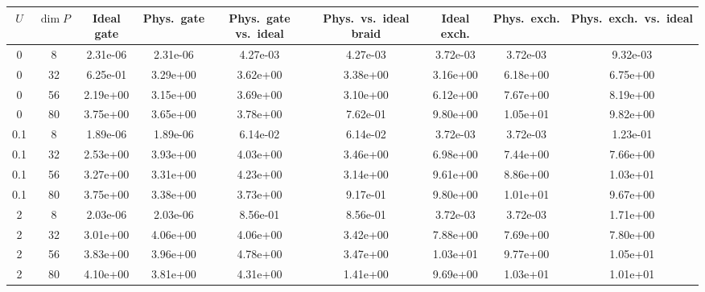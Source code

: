 \begin{tabular}{ccccccccc}
\hline
$U$ & $\dim P$ & Ideal gate & Phys.\ gate & Phys.\ gate vs.\ ideal & Phys.\ vs.\ ideal braid & Ideal exch. & Phys.\ exch. & Phys.\ exch.\ vs.\ ideal \\
\hline
0 & 8 & 2.31e-06 & 2.31e-06 & 4.27e-03 & 4.27e-03 & 3.72e-03 & 3.72e-03 & 9.32e-03 \\
0 & 32 & 6.25e-01 & 3.29e+00 & 3.62e+00 & 3.38e+00 & 3.16e+00 & 6.18e+00 & 6.75e+00 \\
0 & 56 & 2.19e+00 & 3.15e+00 & 3.69e+00 & 3.10e+00 & 6.12e+00 & 7.67e+00 & 8.19e+00 \\
0 & 80 & 3.75e+00 & 3.65e+00 & 3.78e+00 & 7.62e-01 & 9.80e+00 & 1.05e+01 & 9.82e+00 \\
\hline
0.1 & 8 & 1.89e-06 & 1.89e-06 & 6.14e-02 & 6.14e-02 & 3.72e-03 & 3.72e-03 & 1.23e-01 \\
0.1 & 32 & 2.53e+00 & 3.93e+00 & 4.03e+00 & 3.46e+00 & 6.98e+00 & 7.44e+00 & 7.66e+00 \\
0.1 & 56 & 3.27e+00 & 3.31e+00 & 4.23e+00 & 3.14e+00 & 9.61e+00 & 8.86e+00 & 1.03e+01 \\
0.1 & 80 & 3.75e+00 & 3.38e+00 & 3.73e+00 & 9.17e-01 & 9.80e+00 & 1.01e+01 & 9.67e+00 \\
\hline
2 & 8 & 2.03e-06 & 2.03e-06 & 8.56e-01 & 8.56e-01 & 3.72e-03 & 3.72e-03 & 1.71e+00 \\
2 & 32 & 3.01e+00 & 4.06e+00 & 4.06e+00 & 3.42e+00 & 7.88e+00 & 7.69e+00 & 7.80e+00 \\
2 & 56 & 3.83e+00 & 3.96e+00 & 4.78e+00 & 3.47e+00 & 1.03e+01 & 9.77e+00 & 1.05e+01 \\
2 & 80 & 4.10e+00 & 3.81e+00 & 4.31e+00 & 1.41e+00 & 9.69e+00 & 1.03e+01 & 1.01e+01 \\
\hline
\end{tabular}
